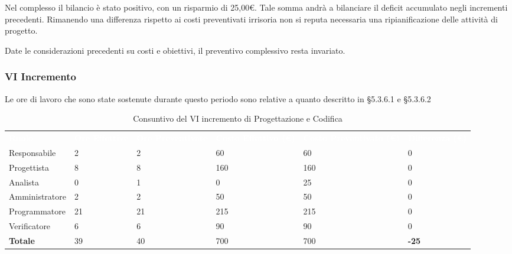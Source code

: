 Nel complesso il bilancio è stato positivo, con un risparmio di 25,00\euro. Tale somma andrà a bilanciare il deficit accumulato negli incrementi precedenti. Rimanendo una differenza rispetto ai costi preventivati irrisoria non si reputa necessaria una ripianificazione delle attività di progetto.

Date le considerazioni precedenti su costi e obiettivi, il preventivo complessivo resta invariato.


\pagebreak


\subsubsection{VI Incremento}
Le ore di lavoro che sono state sostenute durante questo periodo sono relative a quanto descritto in §5.3.6.1 e §5.3.6.2

\begin{table}[H]
\begin{center}
\renewcommand{\arraystretch}{1.5}
\begin{tabular}{ m{}<{\centering}  m{}<{\centering} m{}<{\centering} m{}<{\centering} m{}<{\centering} m{}<{\centering}}
	\rowcolor{darkblue}
	\textcolor{white}{\textbf{Ruolo}} & \textcolor{white}{\textbf{Ore Effettive}} & \textcolor{white}{\textbf{Ore Preventivate}}&\textcolor{white}{\textbf{Costo Effettivo (\euro)}}&\textcolor{white}{\textbf{Costo Preventivato (\euro)}}&\textcolor{white}{\textbf{Differenza (\euro)}}\\ 

	Responsabile  & 2 & 2 & 60 & 60 & 0\\	
	
	Progettista & 8 & 8 & 160 & 160 & 0\\
	
	Analista & 0 & 1 & 0 & 25 & 0\\
	
	Amministratore & 2 & 2 & 50 & 50 & 0\\
	
	Programmatore & 21 & 21 & 215 & 215 & 0\\
	
	Verificatore & 6 & 6 & 90 & 90 & 0\\
	
	\textbf{Totale} & 39 & 40 & 700 & 700 & \textbf{-25} \\
	
\end{tabular}
\caption{Consuntivo del VI incremento di Progettazione e Codifica}
\end{center}
\end{table}

